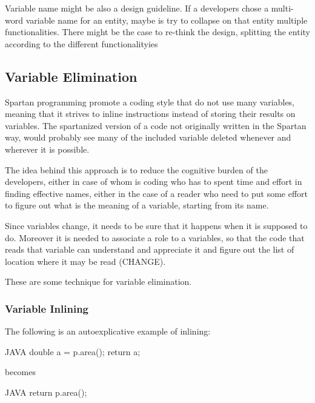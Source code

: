 Variable name might be also a design guideline. If a developers chose a multi-word variable name for an
entity, maybe is try to collapse on that entity multiple functionalities.
There might be the case to re-think the design, splitting the entity according to the different functionalityies


\subsection{Variable Elimination}

Spartan programming promote a coding style that do not use many variables,
meaning that it strives to inline instructions instead of storing their
results on variables. The spartanized version of a code not originally
written in the Spartan way, would probably see many of the included
variable deleted whenever and wherever it is possible.

The idea behind this approach is to reduce the cognitive burden of the
developers, either in case of whom is coding who has to spent time and
effort in finding effective names, either in the case of a reader who need
to put some effort to figure out what is the meaning of a variable,
starting from its name.

Since variables change, it needs to be sure that it happens when it is
supposed to do. Moreover it is needed to associate a role to a variables,
so that the code that reads that variable can understand and appreciate it
and figure out the list of location where it may be read (CHANGE).

These are some technique for variable elimination.

\subsubsection{Variable Inlining}

The following is an autoexplicative example of inlining:

\begin{code}{JAVA}
double a = p.area();
return a;
\end{code}

becomes

\begin{code}{JAVA}
return p.area();
\end{code}

